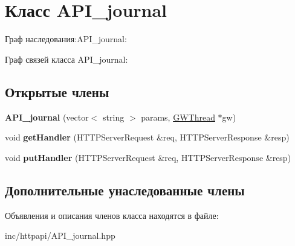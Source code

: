 \hypertarget{classAPI__journal}{}\section{Класс A\+P\+I\+\_\+journal}
\label{classAPI__journal}


Граф наследования\+:A\+P\+I\+\_\+journal\+:


Граф связей класса A\+P\+I\+\_\+journal\+:
\subsection*{Открытые члены}
\begin{DoxyCompactItemize}
\item 
\mbox{\label{classAPI__journal_a89112b2995b7430d812fa0a1ae6d7657}} 
{\bfseries A\+P\+I\+\_\+journal} (vector$<$ string $>$ params, \hyperlink{classGWThread}{G\+W\+Thread} $\ast$gw)
\item 
\mbox{\label{classAPI__journal_ad82da98468221ec9ea223bc8a282e153}} 
void {\bfseries get\+Handler} (H\+T\+T\+P\+Server\+Request \&req, H\+T\+T\+P\+Server\+Response \&resp)
\item 
\mbox{\label{classAPI__journal_a0b99251e4a3dbc5301a9c049099943d6}} 
void {\bfseries put\+Handler} (H\+T\+T\+P\+Server\+Request \&req, H\+T\+T\+P\+Server\+Response \&resp)
\end{DoxyCompactItemize}
\subsection*{Дополнительные унаследованные члены}


Объявления и описания членов класса находятся в файле\+:\begin{DoxyCompactItemize}
\item 
inc/httpapi/A\+P\+I\+\_\+journal.\+hpp\end{DoxyCompactItemize}
